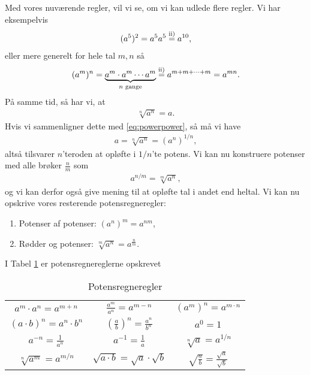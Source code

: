 Med vores nuværende regler, vil vi se, om vi kan udlede flere regler. Vi har eksempelvis
\begin{align*}
(a^5)^2 = a^5a^5 \overset{\textnormal{ii)}}{=} a^{10}, 
\end{align*}
eller mere generelt for hele tal $m,n$ så
\begin{align}\label{eq:powerpower}
(a^m)^n = \underbrace{a^m\cdot a^m\cdots a^m}_{n \textnormal{ gange}} \overset{\textnormal{ii)}}{=}  a^{m+m+\cdots+m} = a^{mn}.
\end{align}
På samme tid, så har vi, at 
\begin{align*}
\sqrt[n]{a^n} = a. 
\end{align*}
Hvis vi sammenligner dette med \eqref{eq:powerpower}, så må vi have
\begin{align*}
a = \sqrt[n]{a^n} = (a^n)^{1/n},
\end{align*}
altså tilsvarer $n$'teroden at opløfte i $1/n$'te potens. Vi kan nu konstruere potenser med alle brøker $\frac{n}{m}$ som
\begin{align*}
a^{n/m} = \sqrt[m]{a^n},
\end{align*}
og vi kan derfor også give mening til at opløfte tal i andet end heltal. 
Vi kan nu opskrive vores resterende potensregneregler:
\begin{enumerate}[label=\roman*)]
\item Potenser af potenser: $(a^n)^m = a^{nm}$,\\
\item Rødder og potenser: $\sqrt[m]{a^n} = a^{\frac{n}{m}}$.
\end{enumerate}

I Tabel \ref{tab:regneregel} er potensregnereglerne opskrevet

\bgroup
\def\arraystretch{2}
\begin{table}[H]
	\centering
	\begin{tabular}{c | c | c}
		$a^m\cdot a^n = a^{m+n}$ & $\frac{a^m}{a^n} = a^{m-n}$ & $ (a^m)^n = a^{m\cdot n} $\\
		$(a\cdot b)^n = a^n\cdot b^n $ & $ \left(\frac{a}{b}\right)^n = \frac{a^n}{b^n}$ & $a^0 = 1$ \\
		$a^{-n} = \frac{1}{a^n} $ & $a^{-1} = \frac{1}{a}$ & $\sqrt[n]{a} = a^{1/n} $ \\ 
		$ \sqrt[n]{a^m}  = a^{m/n}$ & $\sqrt{a\cdot b} = \sqrt{a}\cdot \sqrt{b}$ & $\sqrt{\frac{a}{b}} = \frac{\sqrt{a}}{\sqrt{b}}$ 
	\end{tabular}
	\caption{Potensregneregler}
	\label{tab:regneregel}
\end{table}

